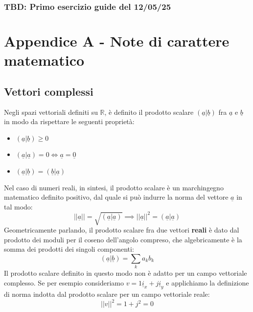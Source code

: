 \documentclass{book}
\begin{document}
    \subsection*{TBD: Primo esercizio guide del 12/05/25}

\chapter*{Appendice A - Note di carattere matematico}
\section*{Vettori complessi}
        Negli spazi vettoriali definiti su $\mathbb{R}$, è definito il prodotto scalare $(\underline{a}|\underline{b})$ fra $\underline{a}$ e $\underline{b}$ in modo da rispettare le seguenti proprietà:
        \begin{itemize}
            \item $(\underline{a} | \underline{b}) \geq 0$ \\
            \item $(\underline{a}|\underline{a}) = 0 \iff \underline{a} = \underline{0}$ \\
            \item $(\underline{a}|\underline{b}) = (\underline{b}|\underline{a})$
        \end{itemize}
    Nel caso di numeri reali, in sintesi, il prodotto scalare è un marchingegno matematico definito positivo, dal quale si può indurre la norma del vettore $\underline{a}$ in tal modo:
    \begin{equation*}
        ||\underline{a}|| = \sqrt{(\underline{a}|\underline{a})} \implies ||\underline{a}||^{2}=(\underline{a}|\underline{a})
    \end{equation*}
    Geometricamente parlando, il prodotto scalare fra due vettori \textbf{reali} è dato dal prodotto dei moduli per il coseno dell'angolo compreso, che algebricamente è la somma dei prodotti dei singoli componenti:
    \begin{equation*}
        (\underline{a}|\underline{b}) = \sum_{k} a_{k}b_{k}
    \end{equation*}
    Il prodotto scalare definito in questo modo non è adatto per un campo vettoriale complesso. Se per esempio consideriamo $v = 1\underline{i}_{x}+j\underline{i}_{y}$ e applichiamo la definizione di norma indotta dal prodotto scalare per un campo vettoriale reale:
    \begin{equation}
        ||v||^{2} = 1+j^{2}=0
    \end{equation}
\end{document}
